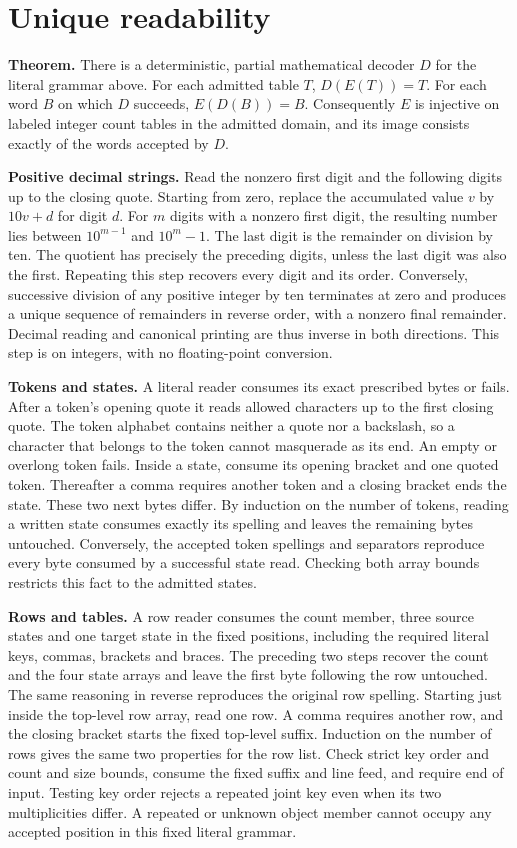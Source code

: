 \documentclass[11pt,a4paper]{article}
\begin{document}
\section{Unique readability}\label{unique-readability}

\textbf{Theorem.} There is a deterministic, partial mathematical decoder \(D\) for the literal grammar above. For each admitted table \(T\), \(D(E(T))=T\). For each word \(B\) on which \(D\) succeeds, \(E(D(B))=B\). Consequently \(E\) is injective on labeled integer count tables in the admitted domain, and its image consists exactly of the words accepted by \(D\).

\textbf{Positive decimal strings.} Read the nonzero first digit and the following digits up to the closing quote. Starting from zero, replace the accumulated value \(v\) by \(10v+d\) for digit \(d\). For \(m\) digits with a nonzero first digit, the resulting number lies between \(10^{m-1}\) and \(10^m-1\). The last digit is the remainder on division by ten. The quotient has precisely the preceding digits, unless the last digit was also the first. Repeating this step recovers every digit and its order. Conversely, successive division of any positive integer by ten terminates at zero and produces a unique sequence of remainders in reverse order, with a nonzero final remainder. Decimal reading and canonical printing are thus inverse in both directions. This step is on integers, with no floating-point conversion.

\textbf{Tokens and states.} A literal reader consumes its exact prescribed bytes or fails. After a token's opening quote it reads allowed characters up to the first closing quote. The token alphabet contains neither a quote nor a backslash, so a character that belongs to the token cannot masquerade as its end. An empty or overlong token fails. Inside a state, consume its opening bracket and one quoted token. Thereafter a comma requires another token and a closing bracket ends the state. These two next bytes differ. By induction on the number of tokens, reading a written state consumes exactly its spelling and leaves the remaining bytes untouched. Conversely, the accepted token spellings and separators reproduce every byte consumed by a successful state read. Checking both array bounds restricts this fact to the admitted states.

\clearpage
\textbf{Rows and tables.} A row reader consumes the count member, three source states and one target state in the fixed positions, including the required literal keys, commas, brackets and braces. The preceding two steps recover the count and the four state arrays and leave the first byte following the row untouched. The same reasoning in reverse reproduces the original row spelling. Starting just inside the top-level row array, read one row. A comma requires another row, and the closing bracket starts the fixed top-level suffix. Induction on the number of rows gives the same two properties for the row list. Check strict key order and count and size bounds, consume the fixed suffix and line feed, and require end of input. Testing key order rejects a repeated joint key even when its two multiplicities differ. A repeated or unknown object member cannot occupy any accepted position in this fixed literal grammar.
\end{document}
